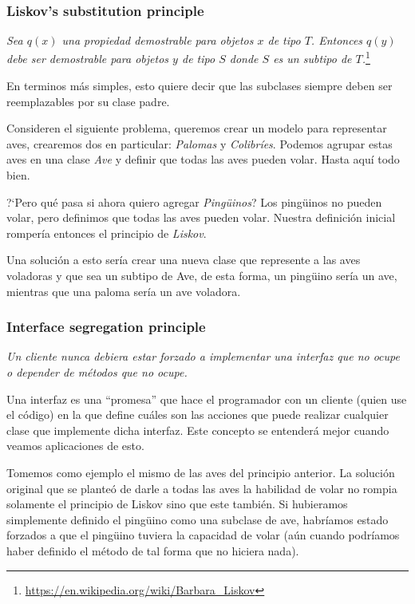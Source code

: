       \subsubsection{Liskov's substitution principle}
        \textit{Sea \(q(x)\) una propiedad demostrable para objetos \(x\) de tipo \(T\). 
        Entonces \(q(y)\) debe ser demostrable para objetos \(y\) de tipo \(S\) donde \(S\)
        es un subtipo de \(T\).}\footnote{
          \url{https://en.wikipedia.org/wiki/Barbara_Liskov}
        }

        En terminos más simples, esto quiere decir que las subclases siempre deben ser 
        reemplazables por su clase padre.

        Consideren el siguiente problema, queremos crear un modelo para representar aves,
        crearemos dos en particular: \textit{Palomas} y \textit{Colibríes}.
        Podemos agrupar estas aves en una clase \textit{Ave} y definir que todas las aves
        pueden volar.
        Hasta aquí todo bien.

        ?`Pero qué pasa si ahora quiero agregar \textit{Pingüinos}?
        Los pingüinos no pueden volar, pero definimos que todas las aves pueden volar. 
        Nuestra definición inicial rompería entonces el principio de \textit{Liskov}.

        Una solución a esto sería crear una nueva clase que represente a las aves 
        voladoras y que sea un subtipo de Ave, de esta forma, un pingüino sería un ave, 
        mientras que una paloma sería un ave voladora.

      \subsubsection{Interface segregation principle}
        \textit{Un cliente nunca debiera estar forzado a implementar una interfaz que no 
        ocupe o depender de métodos que no ocupe.}

        Una interfaz es una ``promesa'' que hace el programador con un cliente (quien use 
        el código) en la que define cuáles son las acciones que puede realizar cualquier 
        clase que implemente dicha interfaz.
        Este concepto se entenderá mejor cuando veamos aplicaciones de esto.

        Tomemos como ejemplo el mismo de las aves del principio anterior.
        La solución original que se planteó de darle a todas las aves la habilidad de 
        volar no rompia solamente el principio de Liskov sino que este también.
        Si hubieramos simplemente definido el pingüino como una subclase de ave, habríamos
        estado forzados a que el pingüino tuviera la capacidad de volar (aún cuando 
        podríamos haber definido el método de tal forma que no hiciera nada).

